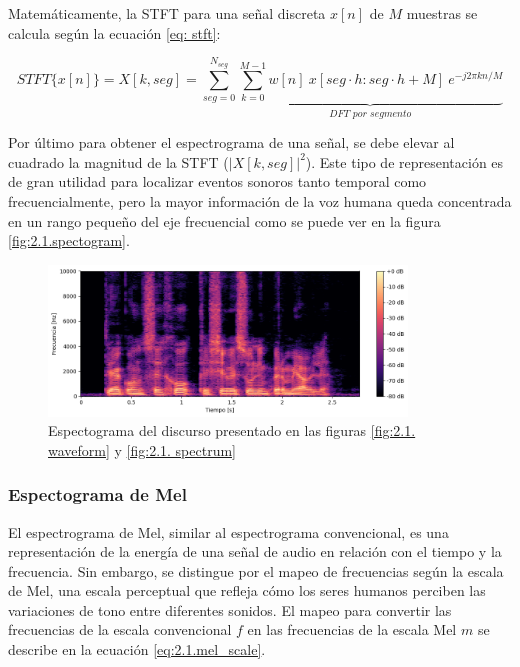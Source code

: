 Matemáticamente, la STFT para una señal discreta $x[n]$ de $M$ muestras se calcula según la ecuación \eqref{eq: stft}:

\vspace{-10mm}

\begin{equation}
    STFT\{x[n]\} = X[k, seg] = \sum \limits_{seg=0}^{N_{seg}} \underbrace{\sum \limits_{k=0}^{M-1} w[n] ~ x[seg\cdot h:seg\cdot h + M] ~ e^{-j2\pi k n / M}}_{\textit{DFT por segmento}}
    \label{eq: stft}
\end{equation}

Por último para obtener el espectrograma de una señal, se debe elevar al cuadrado la magnitud de la STFT ($|X[k, seg]|^2$). Este tipo de representación es de gran utilidad para localizar eventos sonoros tanto temporal como frecuencialmente, pero la mayor información de la voz humana queda concentrada en un rango pequeño del eje frecuencial como se puede ver en la figura \eqref{fig:2.1.spectogram}.

\begin{figure}[h]
    \centering
    \includegraphics[width=0.85\textwidth]{figures/2.1.spectogram.png}
    \caption{Espectograma del discurso presentado en las figuras \eqref{fig:2.1. waveform} y \eqref{fig:2.1. spectrum}} 
    \label{fig:2.1.spectogram}
\end{figure}

\subsubsection{Espectograma de Mel}

El espectrograma de Mel, similar al espectrograma convencional, es una representación de la energía de una señal de audio en relación con el tiempo y la frecuencia. Sin embargo, se distingue por el mapeo de frecuencias según la escala de Mel, una escala perceptual que refleja cómo los seres humanos perciben las variaciones de tono entre diferentes sonidos. El mapeo para convertir  las frecuencias de la escala convencional $f$ en las frecuencias de la escala Mel $m$ se describe en la ecuación \eqref{eq:2.1.mel_scale}.

